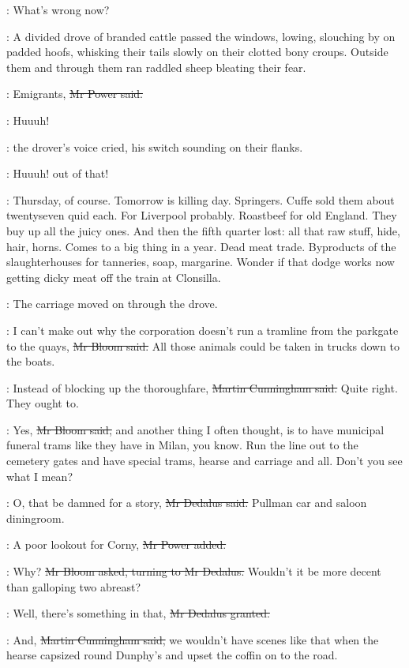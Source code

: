 \cunningham:
What's wrong now?

:
A divided drove of branded cattle passed the windows,
lowing,
slouching by on padded hoofs,
whisking their tails slowly on their clotted bony croups.
Outside them and through them ran
raddled sheep bleating their fear.

\power:
Emigrants,
\sout{Mr Power said.}

\drover:
Huuuh!

:
the drover's voice cried,
his switch sounding on their flanks.

\drover:
Huuuh!
out of that!

\BloomInt:
Thursday, of course.
Tomorrow is killing day.
Springers.
Cuffe sold them about twentyseven quid each.
For Liverpool probably.
Roastbeef for old England.
They buy up all the juicy ones.
And then the fifth quarter lost:
all that raw stuff, hide, hair, horns.
Comes to a big thing in a year.
Dead meat trade.
Byproducts of the slaughterhouses for tanneries, soap, margarine.
Wonder if that dodge works now
getting dicky meat off the train at Clonsilla.

:
The carriage moved on through the drove.

\Bloom:
I can't make out why the corporation doesn't run a tramline
from the parkgate to the quays,
\sout{Mr Bloom said.}
All those animals could be taken in trucks down to the boats.

\cunningham:
Instead of blocking up the thoroughfare,
\sout{Martin Cunningham said.}
Quite right.
They ought to.

\Bloom:
Yes,
\sout{Mr Bloom said,}
and another thing I often thought,
is to have municipal funeral trams like they have in Milan, you know.
Run the line out to the cemetery gates and have special trams,
hearse and carriage and all.
Don't you see what I mean?

\simon:
O, that be damned for a story,
\sout{Mr Dedalus said.}
Pullman car and saloon diningroom.%

\power:
A poor lookout for Corny,
\sout{Mr Power added.}

\Bloom:
Why?
\sout{Mr Bloom asked, turning to Mr Dedalus.}
Wouldn't it be more decent than galloping two abreast?

\simon:
Well, there's something in that,
\sout{Mr Dedalus granted.}

\cunningham:
And,
\sout{Martin Cunningham said,}
we wouldn't have scenes like that
when the hearse capsized round Dunphy's
and upset the coffin on to the road.

